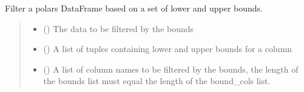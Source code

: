 \documentclass[letterpaper,10pt,english]{sphinxmanual}
\begin{document}

\begin{fulllineitems}
\label{\detokenize{misc:glomar_gridding.utils.filter_bounds}}
\pysigstartsignatures
\pysiglinewithargsret
{}
{\sphinxparamcomma {}\sphinxparamcomma {}\sphinxparamcomma {}}
{}
\pysigstopsignatures
\sphinxAtStartPar
Filter a polars DataFrame based on a set of lower and upper bounds.
\begin{quote}\begin{description}
\begin{itemize}
\item {}
\sphinxAtStartPar
{} () \textendash{} The data to be filtered by the bounds

\item {}
\sphinxAtStartPar
{} () \textendash{} A list of tuples containing lower and upper bounds for a column

\item {}
\sphinxAtStartPar
{} () \textendash{} A list of column names to be filtered by the bounds, the length of
the bounds list must equal the length of the bound\_cols list.


\end{itemize}
\end{description}
\end{quote}
\end{fulllineitems}
\end{document}
